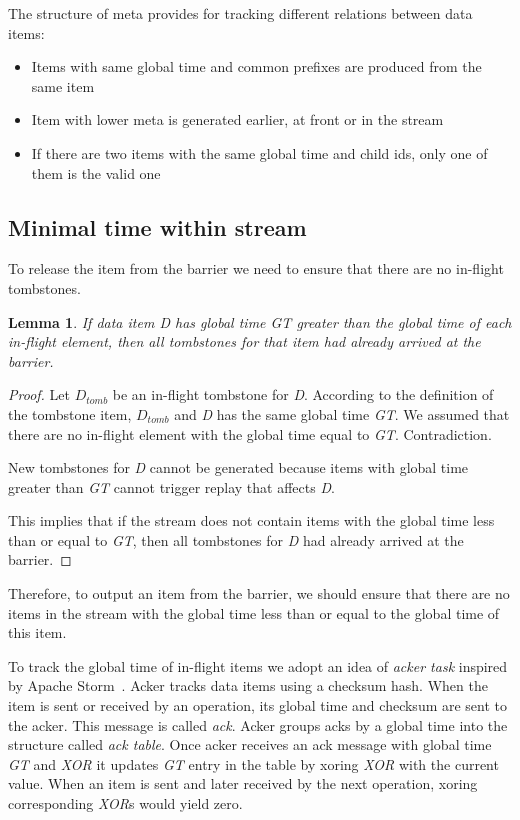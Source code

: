 The structure of meta provides for tracking different relations between data items:

\begin{itemize}
  \item Items with same global time and common prefixes are produced from the same item
  \item Item with lower meta is generated earlier, at front or in the stream
  \item If there are two items with the same global time and child ids, only one of them is the valid one
\end{itemize}

\label{mininal-time}

\subsection{Minimal time within stream}

To release the item from the barrier we need to ensure that there are no in-flight tombstones. 

\newtheorem{minimal-time-claim}{Lemma}

\begin{minimal-time-claim}
  If data item {\it D} has global time {\it GT} greater than the global time of each in-flight element, then all tombstones for that item had already arrived at the barrier.
\end{minimal-time-claim}

\begin{proof}
  Let $D_{tomb}$ be an in-flight tombstone for {\it D}. According to the definition of the tombstone item, $D_{tomb}$ and {\it D} has the same global time {\it GT}. We assumed that there are no in-flight element with the global time equal to {\it GT}. Contradiction.
  
  New tombstones for {\it D} cannot be generated because items with global time greater than {\it GT} cannot trigger replay that affects {\it D}.

  This implies that if the stream does not contain items with the global time less than or equal to {\it GT}, then all tombstones for {\it D} had already arrived at the barrier. 
\end{proof}

Therefore, to output an item from the barrier, we should ensure that there are no items in the stream with the global time less than or equal to the global time of this item.

To track the global time of in-flight items we adopt an idea of {\it acker task} inspired by Apache Storm~\cite{apache:storm}. Acker tracks data items using a checksum hash. When the item is sent or received by an operation, its global time and checksum are sent to the acker. This message is called {\it ack}. Acker groups acks by a global time into the structure called {\it ack table}. Once acker receives an ack message with global time {\it GT} and {\it XOR} it updates {\it GT} entry in the table by xoring {\it XOR} with the current value. When an item is sent and later received by the next operation, xoring corresponding {\it XOR}s would yield zero.


